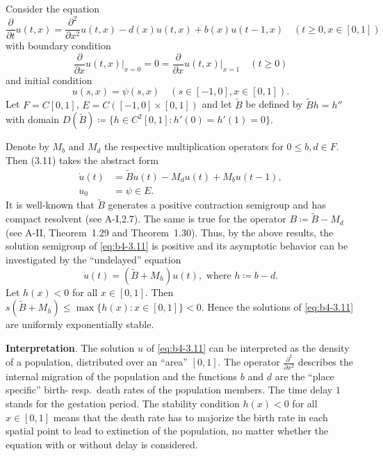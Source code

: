 \begin{example}\label{ex:b4-3.11}
	Consider the equation
\[
    \frac{\partial}{\partial t}u(t,x) = 
    \frac{\partial^2}{\partial x^2}u(t,x) - d(x)u(t,x) + b(x)u(t-1,x) \quad (t\geq0,x\in[0,1])
\]
with boundary condition
\begin{equation}\label{eq:b4-3.11}
    \frac{\partial}{\partial x}u(t,x)\big|_{x=0} = 0 = \frac{\partial}{\partial x}u(t,x)\big|_{x=1} \quad (t\geq0)
\end{equation}
and initial condition
\[
	u(s,x) = \psi(s,x) \quad (s\in[-1,0],x\in[0,1]) .
\]
Let $F = C[0,1]$, $E = C([-1,0]\times[0,1])$ and let $\tilde{B}$ be defined by $\tilde{B}h = h''$ with domain $D(\tilde{B}) \coloneq  \{h \in C^2[0,1] \colon h'(0) = h'(1) = 0\}$.

Denote by $M_b$ and $M_d$ the respective multiplication operators for $0 \leq b,d \in F$. 
Then (3.11) takes the abstract form
\begin{align*}
	\dot{u}(t) &= \tilde{B}u(t) - M_du(t) + M_bu(t-1) ,\\
	u_0 &= \psi \in E .
\end{align*}
It is well-known that $\tilde{B}$ generates a positive contraction semigroup and has compact resolvent (see A-I,2.7). 
The same is true for the operator $B  \coloneq  \tilde{B} - M_d$ (see A-II, Theorem~1.29 and Theorem~1.30). 
Thus, by the above results, the solution semigroup of \eqref{eq:b4-3.11} is positive and its asymptotic behavior can be investigated by the \enquote{undelayed} equation
\[
\dot{u}(t) = (\tilde{B} + M_h)u(t) , \text{ where } h \coloneq  b - d .
\]
Let $h(x) < 0$ for all $x \in [0,1]$.
Then $s(\tilde{B} + M_h) \leq \max\{h(x) \colon x \in [0,1]\} < 0$. 
Hence the solutions of \eqref{eq:b4-3.11} are uniformly exponentially stable.
\end{example}

\textbf{Interpretation}.\quad
	The solution $u$ of \eqref{eq:b4-3.11} can be interpreted as the density of a population, distributed over an \enquote{area} $[0,1]$.
	The operator $\frac{\partial^2}{\partial x^2}$ describes the internal migration of the population and the functions $b$ and $d$ are the \enquote{place specific} birth- resp.\ death rates of the population members. 
	The time delay $1$ stands for the gestation period. 
	The stability condition $h(x) < 0$ for all $x \in [0,1]$ means that the death rate has to majorize the birth rate in each spatial point to lead to extinction of the population, no matter whether the equation with or without delay is considered.

